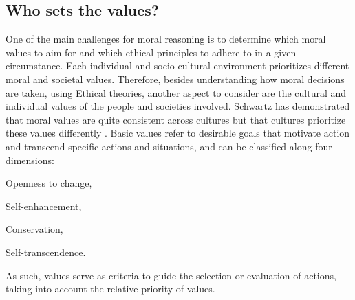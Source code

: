 \documentclass[twocolumn]{article}
\begin{document}







\subsection{Who sets the values?}\label{sec:which}
One of the main challenges for moral reasoning is to determine which moral values to aim for and which ethical principles to adhere to in a given circumstance. Each individual and socio-cultural environment prioritizes different moral and societal values. Therefore, besides understanding how moral decisions are taken, using Ethical theories, another aspect to consider are the cultural and individual values of the people and societies involved. Schwartz has demonstrated that moral values are quite consistent across cultures \cite{Schwartz2006} but that cultures prioritize these values differently \cite{schwartz2006culture,hofstede2001culture}. Basic values refer to desirable goals that motivate action and transcend specific actions and situations, and can be classified along four dimensions:
\begin{inparaenum}[(i)]
\item Openness to change, 
\item Self-enhancement, 
\item Conservation,
\item Self-transcendence.
\end{inparaenum}
As such, values serve as criteria to guide the selection or evaluation of actions, taking into account the relative priority of values. 
\end{document}
